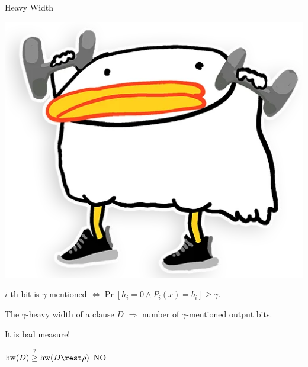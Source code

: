 \begin{frame}{Heavy Width}

    \begin{center}
        \includegraphics[scale = 0.12]{pics/utia-lift.png}        
    \end{center}

    \vspace{0.3cm}

    $i$-th bit is $\gamma$-mentioned $\Leftrightarrow \Pr[h_i = 0 \land P_i(x) = b_i] \ge \gamma$.

    \begin{definition}
        The $\gamma$-heavy width of a clause $D$ $\Rightarrow$ number of $\gamma$-mentioned output bits.
    \end{definition}

    \pause
    \vspace{-1.5cm}
    \begin{minipage}[t][4cm][t]{0.5\linewidth}
        It is bad measure!
        
        \pause
        \vspace{0.2cm}
        $\mathrm{hw}(D) \stackrel{?}{\ge} \mathrm{hw}(D \rest \rho)$ \pause \hspace{0.4cm} \alert{NO}        
    \end{minipage}
    \pause
    \begin{minipage}[c][4cm][c]{0.45\linewidth}
        \vspace{2cm}
        \centering
                
    \end{minipage}

\end{frame}


